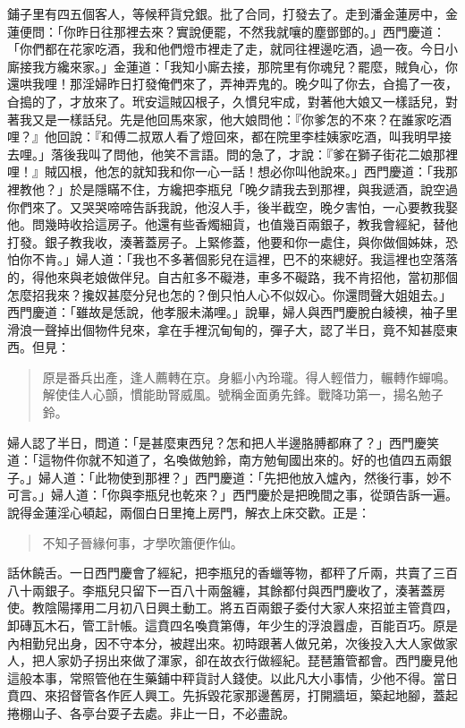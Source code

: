 鋪子里有四五個客人，等候秤貨兌銀。批了合同，打發去了。走到潘金蓮房中，金蓮便問：「你昨日往那裡去來？實說便罷，不然我就嚷的塵鄧鄧的。」西門慶道：「你們都在花家吃酒，我和他們燈市裡走了走，就同往裡邊吃酒，過一夜。今日小廝接我方纔來家。」金蓮道：「我知小廝去接，那院里有你魂兒？罷麼，賊負心，你還哄我哩！那淫婦昨日打發俺們來了，弄神弄鬼的。晚夕叫了你去，㒲搗了一夜，㒲搗的了，才放來了。玳安這賊囚根子，久慣兒牢成，對著他大娘又一樣話兒，對著我又是一樣話兒。先是他回馬來家，他大娘問他：『你爹怎的不來？在誰家吃酒哩？』他回說：『和傅二叔眾人看了燈回來，都在院里李桂姨家吃酒，叫我明早接去哩。」落後我叫了問他，他笑不言語。問的急了，才說：『爹在獅子街花二娘那裡哩！』賊囚根，他怎的就知我和你一心一話！想必你叫他說來。」西門慶道：「我那裡教他？」於是隱瞞不住，方纔把李瓶兒「晚夕請我去到那裡，與我遞酒，說空過你們來了。又哭哭啼啼告訴我說，他沒人手，後半截空，晚夕害怕，一心要教我娶他。問幾時收拾這房子。他還有些香燭細貨，也值幾百兩銀子，教我會經紀，替他打發。銀子教我收，湊著蓋房子。上緊修蓋，他要和你一處住，與你做個姊妹，恐怕你不肯。」婦人道：「我也不多著個影兒在這裡，巴不的來總好。我這裡也空落落的，得他來與老娘做伴兒。自古舡多不礙港，車多不礙路，我不肯招他，當初那個怎麼招我來？攙奴甚麼分兒也怎的？倒只怕人心不似奴心。你還問聲大姐姐去。」西門慶道：「雖故是恁說，他孝服未滿哩。」說畢，婦人與西門慶脫白綾襖，袖子里滑浪一聲掉出個物件兒來，拿在手裡沉甸甸的，彈子大，認了半日，竟不知甚麼東西。但見：
\begin{quote}
原是番兵出產，逢人薦轉在京。身軀小內玲瓏。得人輕借力，輾轉作蟬鳴。解使佳人心顫，慣能助腎威風。號稱金面勇先鋒。戰降功第一，揚名勉子鈴。
\end{quote}

婦人認了半日，問道：「是甚麼東西兒？怎和把人半邊胳膊都麻了？」西門慶笑道：「這物件你就不知道了，名喚做勉鈴，南方勉甸國出來的。好的也值四五兩銀子。」婦人道：「此物使到那裡？」西門慶道：「先把他放入爐內，然後行事，妙不可言。」婦人道：「你與李瓶兒也乾來？」西門慶於是把晚間之事，從頭告訴一遍。說得金蓮淫心頓起，兩個白日里掩上房門，解衣上床交歡。正是：
\begin{quote}
不知子晉緣何事，才學吹簫便作仙。
\end{quote}

話休饒舌。一日西門慶會了經紀，把李瓶兒的香蠟等物，都秤了斤兩，共賣了三百八十兩銀子。李瓶兒只留下一百八十兩盤纏，其餘都付與西門慶收了，湊著蓋房使。教陰陽擇用二月初八日興土動工。將五百兩銀子委付大家人來招並主管賁四，卸磚瓦木石，管工計帳。這賁四名喚賁第傳，年少生的浮浪囂虛，百能百巧。原是內相勤兒出身，因不守本分，被趕出來。初時跟著人做兄弟，次後投入大人家做家人，把人家奶子拐出來做了渾家，卻在故衣行做經紀。琵琶簫管都會。西門慶見他這般本事，常照管他在生藥鋪中秤貨討人錢使。以此凡大小事情，少他不得。當日賁四、來招督管各作匠人興工。先拆毀花家那邊舊房，打開牆垣，築起地腳，蓋起捲棚山子、各亭台耍子去處。非止一日，不必盡說。

